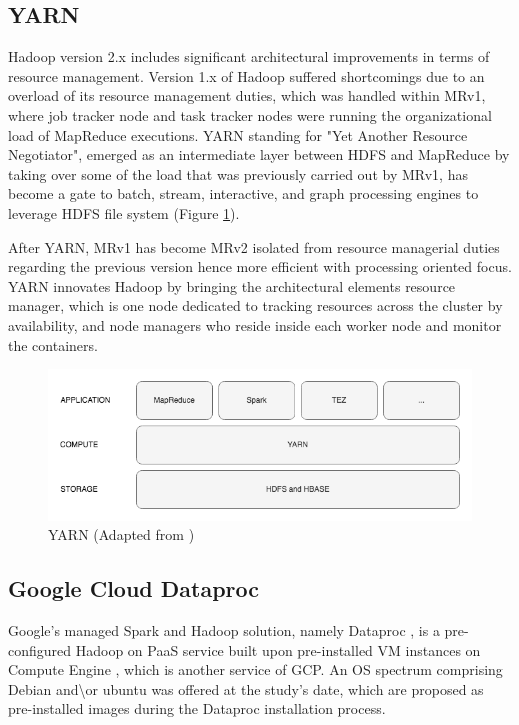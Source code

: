 \documentclass[review]{elsarticle}
\begin{document}
\subsection{YARN}\label{YARN}
Hadoop version 2.x includes significant architectural improvements in terms of resource management. Version 1.x of Hadoop suffered shortcomings due to an overload of its resource management duties, which was handled within MRv1, where job tracker node and task tracker nodes were running the organizational load of MapReduce executions. YARN standing for "Yet Another Resource Negotiator", emerged as an intermediate layer between HDFS and MapReduce by taking over some of the load that was previously carried out by MRv1, has become a gate to batch, stream, interactive, and graph processing engines to leverage HDFS file system (Figure \ref{fig:YARNoverview}). 

After YARN, MRv1 has become MRv2 isolated from resource managerial duties regarding the previous version hence more efficient with processing oriented focus. YARN innovates Hadoop by bringing the architectural elements resource manager, which is one node dedicated to tracking resources across the cluster by availability, and node managers who reside inside each worker node and monitor the containers.

\begin{figure}[h!]
	\caption{YARN (Adapted from  \cite{dean_mapreduce_2004})}
	\label{fig:YARNoverview}
	\includegraphics[width=\textwidth]{YARNoverview}
	\centering
\end{figure}


\subsection{Google Cloud Dataproc}\label{GCP_Dataproc}
Google's managed Spark and Hadoop solution, namely Dataproc \cite{noauthor_dataproc_nodate}, is a pre-configured Hadoop on PaaS service built upon pre-installed VM instances on Compute Engine \cite{noauthor_compute_nodate}, which is another service of GCP. An OS spectrum comprising Debian and\textbackslash{or} ubuntu was offered at the study's date, which are proposed as pre-installed images during the Dataproc installation process. 
\end{document}
